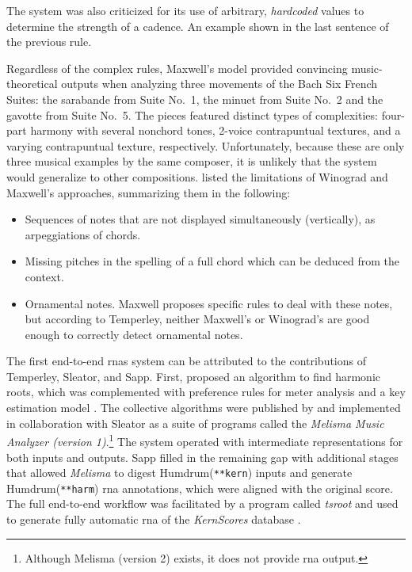 The system was also criticized for its use of arbitrary,
\emph{hardcoded} values to determine the strength of a
cadence. An example shown in the last sentence of the
previous rule.

Regardless of the complex rules, Maxwell's model provided
convincing music-theoretical outputs when analyzing three
movements of the Bach Six French Suites: the sarabande from
Suite No.~1, the minuet from Suite No.~2 and the gavotte
from Suite No.~5. The pieces featured distinct types of
complexities: four-part harmony with several nonchord tones,
2-voice contrapuntual textures, and a varying contrapuntual
texture, respectively. Unfortunately, because these are only
three musical examples by the same composer, it is unlikely
that the system would generalize to other compositions.
\textcite{temperley1997algorithm} listed the limitations of
Winograd and Maxwell's approaches, summarizing them in the
following:

\begin{itemize}
    \item Sequences of notes that are not displayed
    simultaneously (vertically), as arpeggiations of chords.
    \item Missing pitches in the spelling of a full chord
    which can be deduced from the context.
    \item Ornamental notes. Maxwell proposes specific rules
    to deal with these notes, but according to Temperley,
    neither Maxwell's or Winograd's are good enough to
    correctly detect ornamental notes.
\end{itemize}


The first end-to-end \glspl{rna} system can be attributed to
the contributions of Temperley, Sleator, and Sapp. First,
\textcite{temperley1997algorithm} proposed an algorithm to
find harmonic roots, which was complemented with preference
rules for meter analysis \parencite{temperley1999modeling}
and a key estimation model \parencite{temperley1999whats}.
The collective algorithms were published by
\textcite{temperley2004cognition} and implemented in
collaboration with Sleator as a suite of programs called the
\emph{Melisma Music Analyzer (version
1)}.\footnote{Although
Melisma (version 2) exists, it does not provide \gls{rna}
output.} The system operated with intermediate
representations for both inputs and outputs. Sapp filled in
the remaining gap with additional stages that allowed
\emph{Melisma} to digest Humdrum(\texttt{**kern})
inputs and generate Humdrum(\texttt{**harm})
\gls{rna} annotations, which were aligned with the original
score. The full end-to-end workflow was facilitated by a
program called \emph{tsroot} \parencite{sapp2009tsroot} and
used to generate fully automatic \gls{rna} of the
\emph{KernScores} database \parencite{sapp2005online}.

